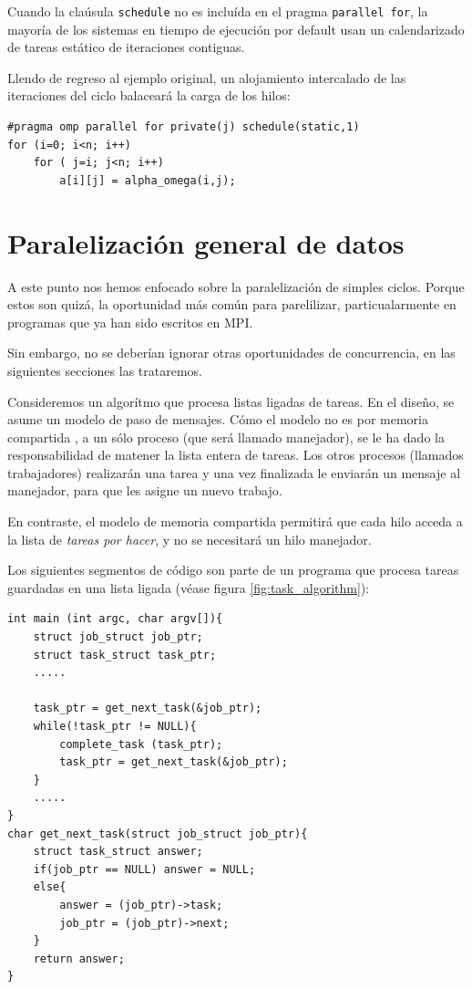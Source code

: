\documentclass[12pt,letterpaper]{book}
\begin{document}
Cuando la claúsula \texttt{schedule} no es incluída en el pragma \texttt{parallel for}, la mayoría de los sistemas en tiempo de ejecución por default usan un calendarizado de tareas estático de iteraciones contiguas.

Llendo de regreso al ejemplo original, un alojamiento intercalado de las iteraciones del ciclo balaceará la carga de los hilos:

\begin{lstlisting}[style=C]
#pragma omp parallel for private(j) schedule(static,1)
for (i=0; i<n; i++)
	for ( j=i; j<n; i++)
		a[i][j] = alpha_omega(i,j);
\end{lstlisting}


\section{Paralelización general de datos}
A este punto nos hemos enfocado sobre la paralelización de simples ciclos. Porque estos son quizá, la oportunidad más común para parelilizar, particualarmente en programas que ya han sido escritos en MPI.

Sin embargo, no se deberían ignorar  otras oportunidades de concurrencia, en las siguientes secciones las trataremos.

Consideremos un algorítmo que procesa listas ligadas de tareas. En el diseño,  se asume un modelo de paso de mensajes. Cómo el modelo no  es por memoria compartida , a un sólo proceso (que será llamado manejador), se le ha dado la responsabilidad de matener la lista entera de tareas. Los otros procesos (llamados trabajadores) realizarán una tarea y una vez finalizada le enviarán un mensaje al manejador, para que les asigne un nuevo trabajo.

En contraste, el modelo de memoria compartida permitirá que cada hilo acceda a la lista de \textit{tareas por hacer}, y no se necesitará un hilo manejador.

Los siguientes segmentos de código son parte de un programa que procesa tareas guardadas en una lista ligada (véase figura \ref{fig:task_algorithm}):

\begin{lstlisting}[style=C]
int main (int argc, char argv[]){
	struct job_struct job_ptr;
	struct task_struct task_ptr;
	.....
	
	task_ptr = get_next_task(&job_ptr);
	while(!task_ptr != NULL){
		complete_task (task_ptr);
		task_ptr = get_next_task(&job_ptr);
	}
	.....
}
char get_next_task(struct job_struct job_ptr){
	struct task_struct answer;
	if(job_ptr == NULL) answer = NULL;
	else{
		answer = (job_ptr)->task;
		job_ptr = (job_ptr)->next;
	}
	return answer;
}
\end{lstlisting}
\end{document}
